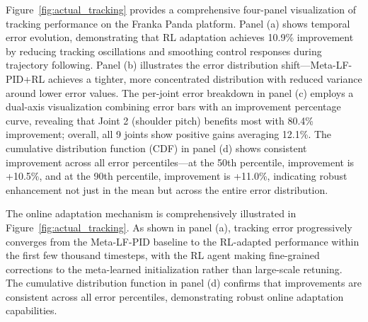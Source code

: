 \documentclass[a4paper]{cas-sc}
\begin{document}
Figure~\ref{fig:actual_tracking} provides a comprehensive four-panel visualization of tracking performance on the Franka Panda platform. Panel (a) shows temporal error evolution, demonstrating that RL adaptation achieves 10.9\% improvement by reducing tracking oscillations and smoothing control responses during trajectory following. Panel (b) illustrates the error distribution shift—Meta-LF-PID+RL achieves a tighter, more concentrated distribution with reduced variance around lower error values. The per-joint error breakdown in panel (c) employs a dual-axis visualization combining error bars with an improvement percentage curve, revealing that Joint 2 (shoulder pitch) benefits most with 80.4\% improvement; overall, all 9 joints show positive gains averaging 12.1\%. The cumulative distribution function (CDF) in panel (d) shows consistent improvement across all error percentiles—at the 50th percentile, improvement is +10.5\%, and at the 90th percentile, improvement is +11.0\%, indicating robust enhancement not just in the mean but across the entire error distribution.


The online adaptation mechanism is comprehensively illustrated in Figure~\ref{fig:actual_tracking}. As shown in panel (a), tracking error progressively converges from the Meta-LF-PID baseline to the RL-adapted performance within the first few thousand timesteps, with the RL agent making fine-grained corrections to the meta-learned initialization rather than large-scale retuning. The cumulative distribution function in panel (d) confirms that improvements are consistent across all error percentiles, demonstrating robust online adaptation capabilities.

\end{document}
